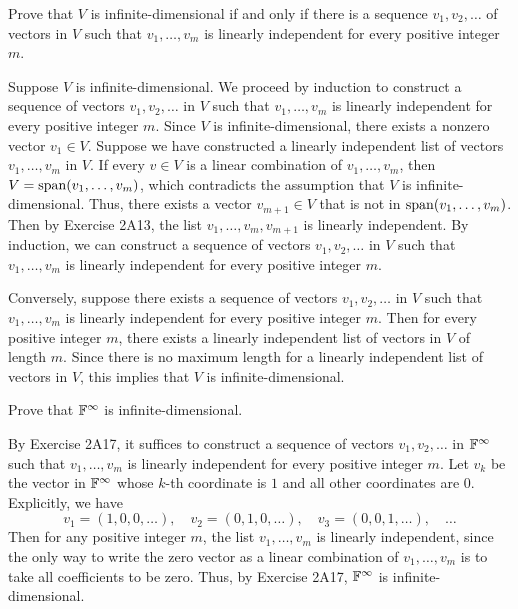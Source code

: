 \begin{exc}
\begin{exercise}
Prove that $V$ is infinite-dimensional if and only if there is a sequence
$v_1,v_2,\dots$ of vectors in $V$ such that $v_1,\dots,v_m$ is linearly
independent for every positive integer $m$.
\end{exercise}
\begin{solution}
Suppose $V$ is infinite-dimensional. We proceed by induction to construct a
sequence of vectors $v_1,v_2,\dots$ in $V$ such that $v_1,\dots,v_m$ is
linearly independent for every positive integer $m$. Since $V$ is
infinite-dimensional, there exists a nonzero vector $v_1\in V$. Suppose we have
constructed a linearly independent list of vectors $v_1,\dots,v_m$ in $V$. If
every $v\in V$ is a linear combination of $v_1,\dots,v_m$, then
$V=\operatorname{span}(v_1,\dots,v_m)$, which contradicts the assumption that $V$ is
infinite-dimensional. Thus, there exists a vector $v_{m+1}\in V$ that is not in
$\operatorname{span}(v_1,\dots,v_m)$. Then by Exercise 2A13, the list
$v_1,\dots,v_m,v_{m+1}$ is linearly independent. By induction, we can construct
a sequence of vectors $v_1,v_2,\dots$ in $V$ such that $v_1,\dots,v_m$ is
linearly independent for every positive integer $m$.

Conversely, suppose there exists a sequence of vectors $v_1,v_2,\dots$ in $V$
such that $v_1,\dots,v_m$ is linearly independent for every positive integer
$m$. Then for every positive integer $m$, there exists a linearly independent
list of vectors in $V$ of length $m$. Since there is no maximum length for a
linearly independent list of vectors in $V$, this implies that $V$ is
infinite-dimensional.
\end{solution}

\begin{exercise}
Prove that $\mathbb{F}^\infty$ is infinite-dimensional.
\end{exercise}
\begin{solution}
By Exercise 2A17, it suffices to construct a sequence of vectors
$v_1,v_2,\dots$ in $\mathbb{F}^\infty$ such that $v_1,\dots,v_m$ is linearly
independent for every positive integer $m$. Let $v_k$ be the vector in
$\mathbb{F}^\infty$ whose $k$-th coordinate is $1$ and all other coordinates are $0$.
Explicitly, we have
\[ v_1=(1,0,0,\dots), \quad v_2=(0,1,0,\dots), \quad v_3=(0,0,1,\dots),
   \quad \dots \]
Then for any positive integer $m$, the list $v_1,\dots,v_m$ is linearly
independent, since the only way to write the zero vector as a linear
combination of $v_1,\dots,v_m$ is to take all coefficients to be zero. Thus,
by Exercise 2A17, $\mathbb{F}^\infty$ is infinite-dimensional.
\end{solution}


\end{exc}
